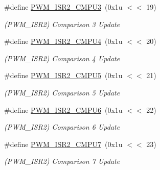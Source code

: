 \begin{DoxyCompactItemize}
\mbox{\label{group__SAMV71__PWM_gae36833b4a117c2855f8a1f23aa6b7c21}} 
\#define \mbox{\hyperlink{group__SAMV71__PWM_gae36833b4a117c2855f8a1f23aa6b7c21}{P\+W\+M\+\_\+\+I\+S\+R2\+\_\+\+C\+M\+P\+U3}}~(0x1u $<$$<$ 19)
\begin{DoxyCompactList}\small\item\em (P\+W\+M\+\_\+\+I\+S\+R2) Comparison 3 Update \end{DoxyCompactList}\item 
\mbox{\label{group__SAMV71__PWM_gaba0de560e45856c32c10b0f8999d0638}} 
\#define \mbox{\hyperlink{group__SAMV71__PWM_gaba0de560e45856c32c10b0f8999d0638}{P\+W\+M\+\_\+\+I\+S\+R2\+\_\+\+C\+M\+P\+U4}}~(0x1u $<$$<$ 20)
\begin{DoxyCompactList}\small\item\em (P\+W\+M\+\_\+\+I\+S\+R2) Comparison 4 Update \end{DoxyCompactList}\item 
\mbox{\label{group__SAMV71__PWM_ga569332e5e110b0690938fe2dc211fa3c}} 
\#define \mbox{\hyperlink{group__SAMV71__PWM_ga569332e5e110b0690938fe2dc211fa3c}{P\+W\+M\+\_\+\+I\+S\+R2\+\_\+\+C\+M\+P\+U5}}~(0x1u $<$$<$ 21)
\begin{DoxyCompactList}\small\item\em (P\+W\+M\+\_\+\+I\+S\+R2) Comparison 5 Update \end{DoxyCompactList}\item 
\mbox{\label{group__SAMV71__PWM_ga62eebe660ee3605cf6488686a2aed84c}} 
\#define \mbox{\hyperlink{group__SAMV71__PWM_ga62eebe660ee3605cf6488686a2aed84c}{P\+W\+M\+\_\+\+I\+S\+R2\+\_\+\+C\+M\+P\+U6}}~(0x1u $<$$<$ 22)
\begin{DoxyCompactList}\small\item\em (P\+W\+M\+\_\+\+I\+S\+R2) Comparison 6 Update \end{DoxyCompactList}\item 
\mbox{\label{group__SAMV71__PWM_ga23f4a640d8df4bcf64a7be7bc7041f9d}} 
\#define \mbox{\hyperlink{group__SAMV71__PWM_ga23f4a640d8df4bcf64a7be7bc7041f9d}{P\+W\+M\+\_\+\+I\+S\+R2\+\_\+\+C\+M\+P\+U7}}~(0x1u $<$$<$ 23)
\begin{DoxyCompactList}\small\item\em (P\+W\+M\+\_\+\+I\+S\+R2) Comparison 7 Update \end{DoxyCompactList}\item 
$$
\end{DoxyCompactItemize}
